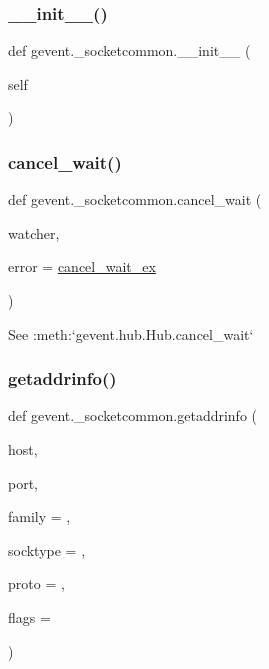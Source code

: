 \subsubsection{\texorpdfstring{\+\_\+\+\_\+init\+\_\+\+\_\+()}{\_\_init\_\_()}}
{\footnotesize\ttfamily def gevent.\+\_\+socketcommon.\+\_\+\+\_\+init\+\_\+\+\_\+ (\begin{DoxyParamCaption}\item[{}]{self }\end{DoxyParamCaption})}

\mbox{\label{namespacegevent_1_1__socketcommon_afa0b81d7e394944cf3c3401619b81b97}} 
\subsubsection{\texorpdfstring{cancel\+\_\+wait()}{cancel\_wait()}}
{\footnotesize\ttfamily def gevent.\+\_\+socketcommon.\+cancel\+\_\+wait (\begin{DoxyParamCaption}\item[{}]{watcher,  }\item[{}]{error = {\ttfamily \hyperlink{classgevent_1_1__socketcommon_1_1cancel__wait__ex}{cancel\+\_\+wait\+\_\+ex}} }\end{DoxyParamCaption})}

\begin{DoxyVerb}See :meth:`gevent.hub.Hub.cancel_wait`\end{DoxyVerb}
 \mbox{\label{namespacegevent_1_1__socketcommon_aba53a9d7d131e2932c207022978aa824}} 
\subsubsection{\texorpdfstring{getaddrinfo()}{getaddrinfo()}}
{\footnotesize\ttfamily def gevent.\+\_\+socketcommon.\+getaddrinfo (\begin{DoxyParamCaption}\item[{}]{host,  }\item[{}]{port,  }\item[{}]{family = {},  }\item[{}]{socktype = {},  }\item[{}]{proto = {},  }\item[{}]{flags = {} }\end{DoxyParamCaption})}

